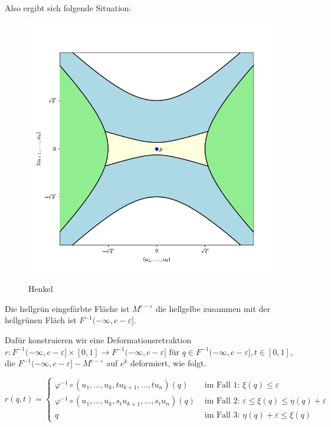 \begin{bigproof}
\begin{smallproof}
        Also ergibt sich folgende Situation:

        \begin{figure}[H]
            \centering
            \includegraphics[width=0.8\linewidth]{../resources/Me-Diagram7-handle.png}
            \label{fig:me-diagram7}
            \caption{Henkel}
        \end{figure}

        Die hellgrün eingefärbte Fläche ist $M^{c - \varepsilon}$ die hellgelbe
        zusammen mit der hellgrünen Fläch ist $F^{-1}(-\infty, c - \varepsilon]$. 

        Dafür konstruieren wir eine Deformationsretraktion
        $r: F^{-1}(-\infty, c - \varepsilon] \times [0,1] \to F^{-1}(-\infty, c - \varepsilon]$
        für $q \in F^{-1}(-\infty, c - \varepsilon], t \in [0, 1]$, die 
        $F^{-1}(-\infty, c - \varepsilon] - M^{c - \varepsilon}$ auf $e^k$ 
        deformiert, wie folgt.

        \[
            r(q, t) = \begin{cases}
                \varphi^{-1} \circ (u_1, ..., u_k, tu_{k + 1}, ..., tu_n)(q)
                    & \text{ im Fall 1: } \xi(q) \leq \varepsilon \\
                \varphi^{-1} \circ (u_1, ..., u_k, s_tu_{k + 1}, ..., s_tu_n)(q)
                    & \text{ im Fall 2: } \varepsilon \leq \xi(q) \leq \eta(q) + \varepsilon \\
                q & \text{ im Fall 3: } \eta(q) + \varepsilon \leq \xi(q)
            \end{cases}
        \]


\end{smallproof}
\end{bigproof}
